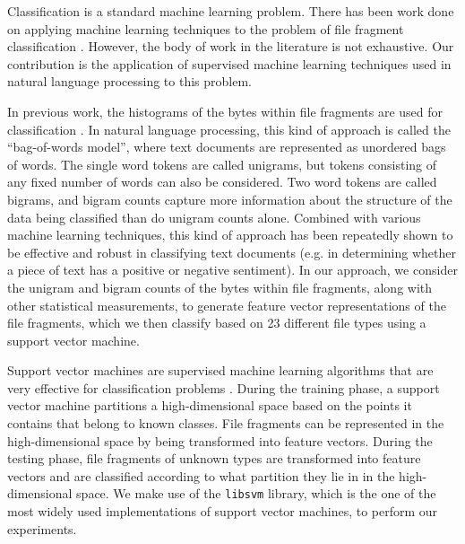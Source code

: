 \documentclass[letter,11pt]{article}
\begin{document}
Classification is a standard machine learning problem. There has been work done on applying machine learning techniques to the problem of file fragment classification \cite{Axelsson10, Conti10, Li10, Veenman07}. However, the body of work in the literature is not exhaustive. Our contribution is the application of supervised machine learning techniques used in natural language processing to this problem.

In previous work, the histograms of the bytes within file fragments are used for classification \cite{Li10, Veenman07}. In natural language processing, this kind of approach is called the ``bag-of-words model'', where text documents are represented as unordered bags of words. The single word tokens are called unigrams, but tokens consisting of any fixed number of words can also be considered. Two word tokens are called bigrams, and bigram counts capture more information about the structure of the data being classified than do unigram counts alone. Combined with various machine learning techniques, this kind of approach has been repeatedly shown to be effective and robust in classifying text documents (e.g. in determining whether a piece of text has a positive or negative sentiment). In our approach, we consider the unigram and bigram counts of the bytes within file fragments, along with other statistical measurements, to generate feature vector representations of the file fragments, which we then classify based on 23 different file types using a support vector machine.

Support vector machines are supervised machine learning algorithms that are very effective for classification problems \cite{Li10}. During the training phase, a support vector machine partitions a high-dimensional space based on the points it contains that belong to known classes. File fragments can be represented in the high-dimensional space by being transformed into feature vectors. During the testing phase, file fragments of unknown types are transformed into feature vectors and are classified according to what partition they lie in in the high-dimensional space. We make use of the \texttt{libsvm} \cite{CC01a} library, which is the one of the most widely used implementations of support vector machines, to perform our experiments.
\end{document}
